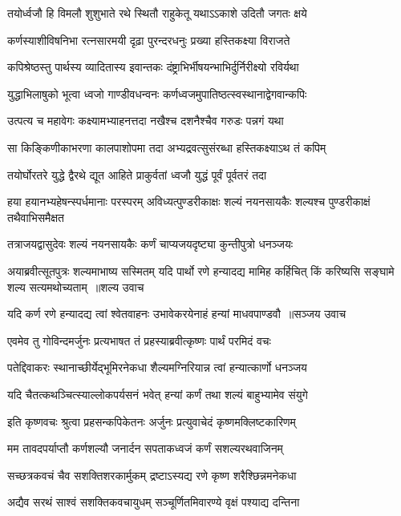 \twolineshloka
{तयोर्ध्वजौ हि विमलौ शुशुभाते रथे स्थितौ}
{राहुकेतू यथाऽऽकाशे उदितौ जगतः क्षये}


\twolineshloka
{कर्णस्याशीविषनिभा रत्नसारमयी दृढ़ा}
{पुरन्दरधनुः प्रख्या हस्तिकक्ष्या विराजते}


\twolineshloka
{कपिश्रेष्ठस्तु पार्थस्य व्यादितास्य इवान्तकः}
{दंष्ट्राभिर्भीषयन्भाभिर्दुर्निरीक्ष्यो रविर्यथा}


\twolineshloka
{युद्धाभिलाषुको भूत्वा ध्वजो गाण्डीवधन्वनः}
{कर्णध्वजमुपातिष्ठत्स्वस्थानाद्वेगवान्कपिः}


\twolineshloka
{उत्पत्य च महावेगः कक्ष्यामभ्याहनत्तदा}
{नखैश्च दशनैश्चैव गरुडः पन्नगं यथा}


\twolineshloka
{सा किङ्किणीकाभरणा कालपाशोपमा तदा}
{अभ्यद्रवत्सुसंरब्धा हस्तिकक्ष्याऽथ तं कपिम्}


\twolineshloka
{तयोर्घोरतरे युद्धे द्वैरथे द्यूत आहिते}
{प्राकुर्वतां ध्वजौ युद्धं पूर्वं पूर्वतरं तदा}


\threelineshloka
{हया हयानभ्यहेषन्स्पर्धमानाः परस्परम्}
{अविध्यत्पुण्डरीकाक्षः शल्यं नयनसायकैः}
{शल्यश्च पुण्डरीकाक्षं तथैवाभिसमैक्षत}


\twolineshloka
{तत्राजयद्वासुदेवः शल्यं नयनसायकैः}
{कर्णं चाप्यजयदृष्ट्या कुन्तीपुत्रो धनञ्जयः}


अयाब्रवीत्सूतपुत्रः शल्यमाभाष्य सस्मितम्
\threelineshloka
{यदि पार्थो रणे हन्यादद्य मामिह कर्हिचित्}
{किं करिष्यसि सङ्घामे शल्य सत्यमथोच्यताम् ॥शल्य उवाच}
{}


\threelineshloka
{यदि कर्ण रणे हन्यादद्य त्वां श्वेतवाहनः}
{उभावेकरयेनाहं हन्यां माधवपाण्डवौ ॥सञ्जय उवाच}
{}


\twolineshloka
{एवमेव तु गोविन्दमर्जुनः प्रत्यभाषत}
{तं प्रहस्याब्रवीत्कृष्णः पार्थं परमिदं वचः}


\twolineshloka
{पतेद्दिवाकरः स्थानाच्छीर्येद्भूमिरनेकधा}
{शैल्यमग्निरियान्न त्वां हन्यात्कार्णो धनञ्जय}


\twolineshloka
{यदि चैतत्कथञ्चित्स्याल्लोकपर्यसनं भवेत्}
{हन्यां कर्णं तथा शल्यं बाहुभ्यामेव संयुगे}


\twolineshloka
{इति कृष्णवचः श्रुत्वा प्रहसन्कपिकेतनः}
{अर्जुनः प्रत्युवाचेदं कृष्णमक्लिष्टकारिणम्}


\twolineshloka
{मम तावदपर्याप्तौ कर्णशल्यौ जनार्दन}
{सपताकध्वजं कर्णं सशल्यरथवाजिनम्}


\twolineshloka
{सच्छत्रकवचं चैव सशक्तिशरकार्मुकम्}
{द्रष्टाऽस्यद्य रणे कृष्ण शरैश्छिन्नमनेकधा}


\twolineshloka
{अद्यैव सरथं साश्वं सशक्तिकवचायुधम्}
{सञ्चूर्णितमिवारण्ये वृक्षं पश्याद्य दन्तिना}



